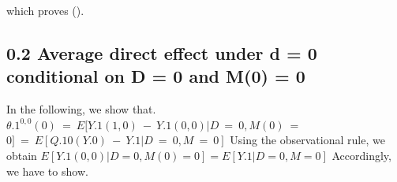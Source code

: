 \documentclass{article}
\begin{document}
which proves ().


\subsection*{0.2 Average direct effect under d = 0 conditional on D = 0
and M(0) = 0}


In the following, we show that. $\theta . { 1 } ^ { 0, 0 } ( 0 ) ~ = ~ E [ Y . { 1 } ( 1, 0 ) ~ - ~ Y . { 1 } ( 0, 0 ) | D ~ = ~ 0, M ( 0 ) ~ =$
$0 ] ~ = ~ E [ Q . { 1 0 } ( Y . { 0 } ) ~ - ~ Y . { 1 } | D ~ = ~ 0, M ~ = ~ 0 ]$ Using the observational rule, we obtain
$E [ Y . { 1 } ( 0, 0 ) | D = 0, M ( 0 ) = 0 ] = E [ Y . { 1 } | D = 0, M = 0 ]$ Accordingly, we have to show.
\end{document}
